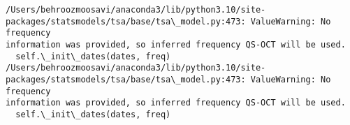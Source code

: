 \documentclass[11pt]{article}
\begin{document}
    \begin{Verbatim}[commandchars=\\\{\}]
/Users/behroozmoosavi/anaconda3/lib/python3.10/site-
packages/statsmodels/tsa/base/tsa\_model.py:473: ValueWarning: No frequency
information was provided, so inferred frequency QS-OCT will be used.
  self.\_init\_dates(dates, freq)
/Users/behroozmoosavi/anaconda3/lib/python3.10/site-
packages/statsmodels/tsa/base/tsa\_model.py:473: ValueWarning: No frequency
information was provided, so inferred frequency QS-OCT will be used.
  self.\_init\_dates(dates, freq)
    \end{Verbatim}

    \begin{center}
    \end{center}
    { \hspace*{\fill} \\}
    
\end{document}
